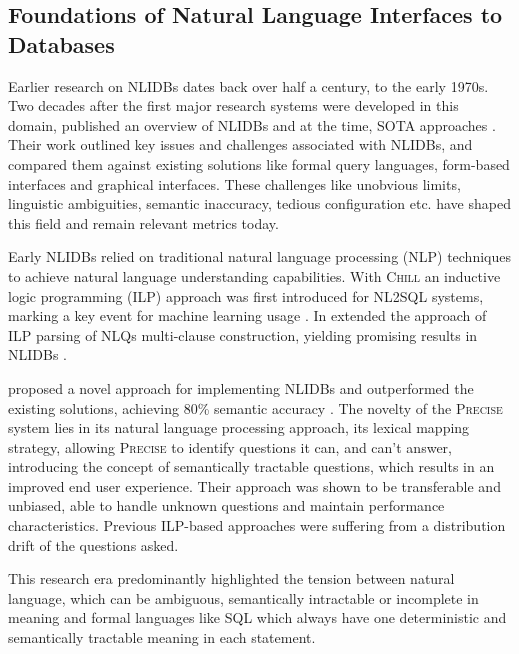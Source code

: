 \subsection{Foundations of Natural Language Interfaces to Databases}

Earlier research on NLIDBs dates back over half a century, to the early 1970s.
Two decades after the first major research systems were developed in this
domain, \citeauthor*{NLIDBs} published an overview of NLIDBs and at the time,
SOTA approaches \citep{NLIDBs}. Their work outlined key issues and challenges
associated with NLIDBs, and compared them against existing solutions like
formal query languages, form-based interfaces and graphical interfaces. These
challenges like unobvious limits, linguistic ambiguities, semantic inaccuracy,
tedious configuration etc. have shaped this field and remain relevant metrics
today.

Early NLIDBs relied on traditional natural language processing (NLP)
techniques to achieve natural language understanding capabilities.
With \textsc{Chill} an inductive logic programming (ILP) approach was first
introduced for NL2SQL systems, marking a key event for
machine learning usage \citep{ILPParsing}. In \citeyear{ILPParsing2}
\citeauthor*{ILPParsing2} extended the approach of ILP parsing of NLQs
multi-clause construction, yielding promising results in NLIDBs
\citep{ILPParsing2}.

\citeauthor{NLIDBTheory} proposed a novel approach for implementing NLIDBs and
outperformed the existing solutions, achieving 80\% semantic accuracy
\citep{NLIDBTheory}. The novelty of the \textsc{Precise} system lies in its
natural language processing approach, its lexical mapping strategy, allowing
\textsc{Precise} to identify questions it can, and can't answer, introducing
the concept of semantically tractable questions, which results in an improved
end user experience. Their approach was shown to be transferable and unbiased,
able to handle unknown questions and maintain performance characteristics.
Previous ILP-based approaches were suffering from a distribution drift of the
questions asked.

This research era predominantly highlighted the tension between natural
language, which can be ambiguous, semantically intractable or incomplete in
meaning and formal languages like SQL which always have one deterministic and
semantically tractable meaning in each statement.
